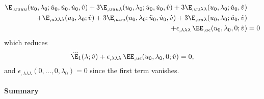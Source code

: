 \begin{equation}
  \begin{aligned}[b]
    \E_{,uuuu}(u_0, \lambda_0; \dot{u}_0, \dot{u}_0, \dot{u}_0, \hat{v})
    + 3\E_{,uuu\lambda}(u_0, \lambda_0; \dot{u}_0, \dot{u}_0, \hat{v})
    + 3\E_{,uu\lambda\lambda}(u_0, \lambda_0; \dot{u}_0, \hat{v}) &\\
    + \E_{,u\lambda\lambda\lambda}(u_0, \lambda_0; \hat{v})
    + 3\E_{,uuu}(u_0, \lambda_0; \ddot{u}_0, \dot{u}_0, \hat{v})
    + 3\E_{,uu\lambda}(u_0, \lambda_0; \ddot{u}_0, \hat{v}) &\\
    + \epsilon_{,\lambda\lambda\lambda} \, \EE_{,u\epsilon}(u_0, \lambda_0, 0; \hat{v}) &= 0
  \end{aligned}
\end{equation}
which reduces
\begin{equation}
  \dddot{\E}_1(\lambda; \hat{v}) + \epsilon_{,\lambda\lambda\lambda} \, \EE_{,u\epsilon}(u_0, \lambda_0, 0; \hat{v}) = 0,
\end{equation}
and \(\epsilon_{,\lambda\lambda\lambda}(0, \ldots, 0, \lambda_0) = 0\) since the first term vanishes.

\paragraph{Summary}

